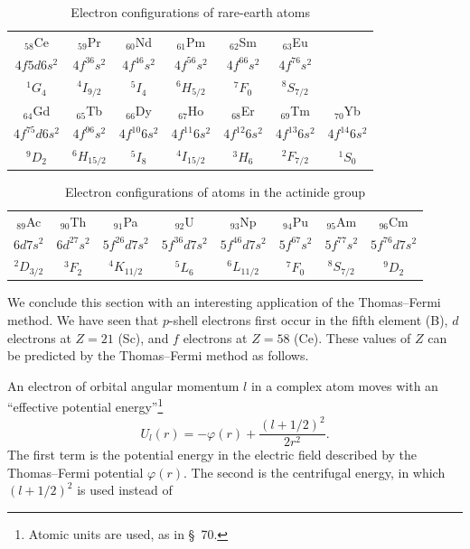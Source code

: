 \begin{table}[ht]
\centering\scriptsize
\caption{Electron configurations of rare-earth atoms}
\begin{tabular}{ccccccc}
$_{58}$Ce&$_{59}$Pr&$_{60}$Nd&$_{61}$Pm&$_{62}$Sm&$_{63}$Eu\\
$4f5d6s^2$&$4f^36s^2$&$4f^46s^2$&$4f^56s^2$&$4f^66s^2$&$4f^76s^2$\\
$^1G_4$&$^4I_{9/2}$&$^5I_4$&$^6H_{5/2}$&$^7F_0$&$^8S_{7/2}$\\\hline
$_{64}$Gd&$_{65}$Tb&$_{66}$Dy&$_{67}$Ho&$_{68}$Er&$_{69}$Tm&$_{70}$Yb\\
$4f^75d6s^2$&$4f^96s^2$&$4f^{10}6s^2$&$4f^{11}6s^2$&$4f^{12}6s^2$&$4f^{13}6s^2$&$4f^{14}6s^2$\\
$^9D_2$&$^6H_{15/2}$&$^5I_8$&$^4I_{15/2}$&$^3H_6$&$^2F_{7/2}$&$^1S_0$
\end{tabular}
\end{table}

\begin{table}[ht]
\centering\scriptsize
\caption{Electron configurations of atoms in the actinide group}
\begin{tabular}{cccccccc}
$_{89}$Ac&$_{90}$Th&$_{91}$Pa&$_{92}$U&$_{93}$Np&$_{94}$Pu&$_{95}$Am&$_{96}$Cm\\
$6d7s^2$&$6d^27s^2$&$5f^26d7s^2$&$5f^36d7s^2$&$5f^46d7s^2$&$5f^67s^2$&$5f^77s^2$&$5f^76d7s^2$\\
$^2D_{3/2}$&$^3F_2$&$^4K_{11/2}$&$^5L_6$&$^6L_{11/2}$&$^7F_0$&$^8S_{7/2}$&$^9D_2$
\end{tabular}
\end{table}

We conclude this section with an interesting application of the Thomas--Fermi method. We have seen that $p$-shell electrons first occur in the fifth element (B), $d$ electrons at $Z=21$ (Sc), and $f$ electrons at $Z=58$ (Ce). These values of $Z$ can be predicted by the Thomas--Fermi method as follows.

An electron of orbital angular momentum $l$ in a complex atom moves with an ``effective potential energy''\footnote{Atomic units are used, as in \S~70.}
\[
 U_l(r)=-\varphi(r)+\frac{(l+1/2)^2}{2r^2}.
\]
The first term is the potential energy in the electric field described by the Thomas--Fermi potential $\varphi(r)$. The second is the centrifugal energy, in which $(l+1/2)^2$ is used instead of

